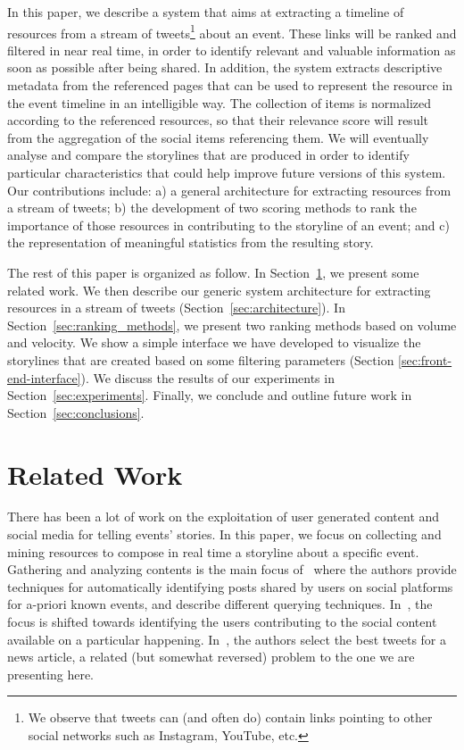 \documentclass{sig-alternate}
\begin{document}
In this paper, we describe a system that aims at extracting a timeline of resources from a stream of tweets\footnote{We observe that tweets can (and often do) contain links pointing to other social networks such as Instagram, YouTube, etc.} about an event. These links will be ranked and filtered in near real time, in order to identify relevant and valuable information as soon as possible after being shared. In addition, the system extracts descriptive metadata from the referenced pages that can be used to represent the resource in the event timeline in an intelligible way. The collection of items is normalized according to the referenced resources, so that their relevance score will result from the aggregation of the social items referencing them. We will eventually analyse and compare the storylines that are produced in order to identify particular characteristics that could help improve future versions of this system. Our contributions include: a) a general architecture for extracting resources from a stream of tweets; b) the development of two scoring methods to rank the importance of those resources in contributing to the storyline of an event; and c) the representation of meaningful statistics from the resulting story.

The rest of this paper is organized as follow. In Section~\ref{sec:related-work}, we present some related work. We then describe our generic system architecture for extracting resources in a stream of tweets (Section~\ref{sec:architecture}). In Section~\ref{sec:ranking_methods}, we present two ranking methods based on volume and velocity. We show a simple interface we have developed to visualize the storylines that are created based on some filtering parameters (Section \ref{sec:front-end-interface}). We discuss the results of our experiments in Section~\ref{sec:experiments}. Finally, we conclude and outline future work in Section~\ref{sec:conclusions}.


\section{Related Work}
\label{sec:related-work}
There has been a lot of work on the exploitation of user generated content and social media for telling events' stories. In this paper, we focus on collecting and mining resources to compose in real time a storyline about a specific event. Gathering and analyzing contents is the main focus of~\cite{becker:WSDM12} where the authors provide techniques for automatically identifying posts shared by users on social platforms for a-priori known events, and describe different querying techniques. In~\cite{naaman:CSCW12}, the focus is shifted towards identifying the users contributing to the social content available on a particular happening. In~\cite{stajner:KDD13}, the authors select the best tweets for a news article, a related (but somewhat reversed) problem to the one we are presenting here.
\end{document}
